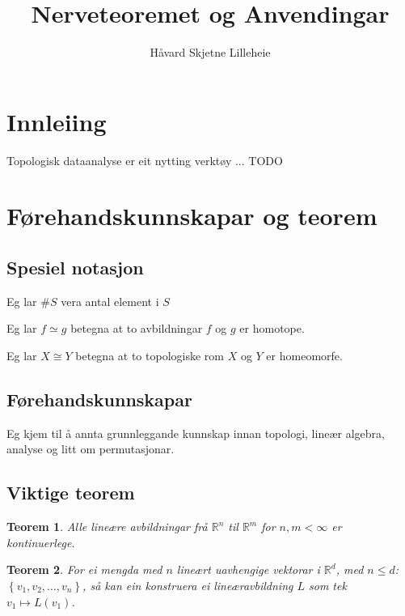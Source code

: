 \documentclass[a4paper, 12pt, norsk]{article}
\title{Nerveteoremet og Anvendingar}
\author{Håvard Skjetne Lilleheie}
\theoremstyle{plain}
\newtheorem{theorem}{Teorem}[section]
\theoremstyle{definition}
\newcommand{\Rb}{\mathbb{R}}
\newcommand{\set}[1]{ \left \{ #1 \right \} } %
\begin{document}
\maketitle

\tableofcontents

\newpage

\section{Innleiing}

Topologisk dataanalyse er eit nytting verktøy ... TODO

\section{Førehandskunnskapar og teorem}

\subsection{Spesiel notasjon}
 
Eg lar \( \#S \) vera antal element i \( S \)

Eg lar \( f \simeq  g \) betegna at to avbildningar \( f \) og \( g \) er homotope.

Eg lar \( X \cong Y \) betegna at to topologiske rom \( X \) og \( Y \) er homeomorfe.

\subsection{Førehandskunnskapar}

Eg kjem til å annta grunnleggande kunnskap innan topologi, lineær algebra, analyse og litt om permutasjonar.

\subsection{Viktige teorem}

\begin{theorem} \label{thm:begrensa-lin-op-er-kont}
	Alle lineære avbildningar frå \( \Rb^n \) til \( \Rb^m \) for \( n, m < \infty \) er kontinuerlege.
\end{theorem}

\begin{theorem} \label{thm:definer-lin-op}
	For ei mengda med \( n \) lineært uavhengige vektorar i \( \Rb^d \), med \( n \leq d \): \( \set{v_1, v_2, \dots, v_n} \), så kan ein konstruera ei lineæravbildning \( L \) som tek \( v_1 \mapsto L(v_1) \).
\end{theorem}
\end{document}
